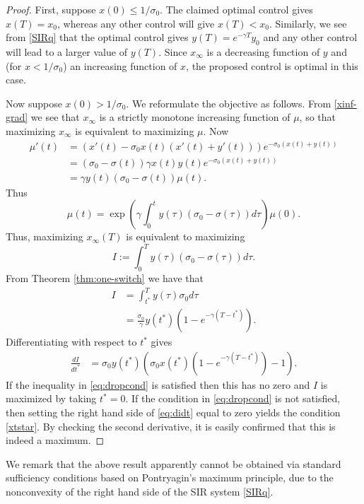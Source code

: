 \documentclass[english,12pt,letter]{article}
\newcommand{\Rnot}{\sigma_0}
\newcommand{\Sinf}{x_\infty}
\begin{document}
\begin{proof}
First, suppose $x(0)\le1/\sigma_0$.  The claimed optimal control gives $x(T)=x_0$, whereas
any other control will give $x(T)<x_0$.  Similarly, we see from \eqref{SIRq} that
the optimal control gives $y(T)=e^{-\gamma T}y_0$ and any other control will
lead to a larger value of $y(T)$.  Since $\Sinf$ is a decreasing function of $y$ and
(for $x<1/\Rnot$) an increasing function of $x$, the proposed control is optimal in this case.

Now suppose $x(0)>1/\sigma_0$.  We reformulate the objective as follows.
From \eqref{xinf-grad} we see that $\Sinf$ is a strictly monotone increasing function of $\mu$,
so that maximizing $\Sinf$ is equivalent to maximizing $\mu$. Now
\begin{align*}
    \mu'(t) & = (x'(t)-\Rnot x(t)(x'(t)+y'(t)))e^{-\Rnot(x(t)+y(t))} \\
            & = (\Rnot - \sigma(t))\gamma x(t) y(t) e^{-\Rnot(x(t)+y(t))} \\
            & = \gamma y(t) (\Rnot-\sigma(t))\mu(t).
\end{align*}
Thus
$$
    \mu(t) = \exp\left(\gamma \int_0^t y(\tau) (\Rnot-\sigma(\tau)) d\tau\right) \mu(0).
$$
Thus, maximizing $\Sinf(T)$ is equivalent to maximizing
$$
    I := \int_0^T y(\tau) (\Rnot-\sigma(\tau)) d\tau.
$$
From Theorem \ref{thm:one-switch} we have that
\begin{align*}
    I & = \int_{t^*}^T y(\tau) \Rnot d\tau \\
      & = \frac{\Rnot}{\gamma} y(t^*) \left(1-e^{-\gamma(T-t^*)}\right).
\end{align*}
Differentiating with respect to $t^*$ gives
\begin{align} \label{eq:didt}
    \frac{d I}{dt^*} & = \Rnot y(t^*)\left( \Rnot x(t^*)(1-e^{-\gamma(T-t^*)}) - 1 \right).
\end{align}
If the inequality in \eqref{eq:dropcond} is satisfied then this has no
zero and $I$ is maximized by taking $t^*=0$.  If the condition in
\eqref{eq:dropcond} is not satisfied, then setting the right hand side
of \eqref{eq:didt} equal to zero yields the condition \eqref{xtstar}.
By checking the second derivative, it is easily confirmed that this
is indeed a maximum.
\end{proof}

We remark that the above result apparently cannot be obtained via standard
sufficiency conditions based on Pontryagin's maximum principle, due to the
nonconvexity of the right hand side of the SIR system \eqref{SIRq}.
\end{document}
